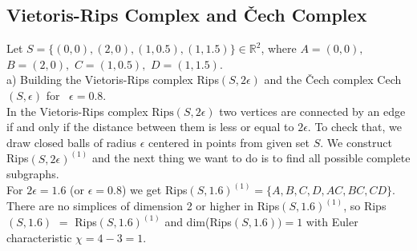 \documentclass[a4paper,11pt]{article}
\begin{document}
\subsection{Vietoris-Rips Complex and Čech Complex}
Let $S = \{ (0,0),(2,0),(1,0.5),(1,1.5) \} \in \mathbb{R}^2$, where $A = (0,0),$ $B = (2,0),$ $C = (1,0.5),$ $D = (1,1.5)$.
\\


\noindent
a) Building the Vietoris-Rips complex Rips$(S, 2\epsilon)$ and the Čech complex Cech$(S, \epsilon)$ for $ \ \epsilon = 0.8$.
\\
In the Vietoris-Rips complex $\text{Rips}(S, 2\epsilon)$ two vertices are connected by an edge if and only if the distance between them is less or equal to $2 \epsilon$.
To check that, we draw closed balls of radius $\epsilon$ centered in points from given set $S$.
We construct Rips$(S, 2\epsilon)^{(1)}$ and the next thing we want to do is to find all possible complete subgraphs.
\\
For $2 \epsilon = 1.6$ (or $\epsilon = 0.8$) we get Rips$(S, 1.6)^{(1)} = \{A, B, C, D, AC, BC, CD\}$. There are no simplices of dimension 2 or higher in Rips$(S, 1.6)^{(1)}$, 
so Rips$(S, 1.6)$ $=$ Rips$(S, 1.6)^{(1)}$ and dim(Rips$(S, 1.6)) = 1$ with Euler characteristic $\chi = 4 - 3 = 1$.
\end{document}

